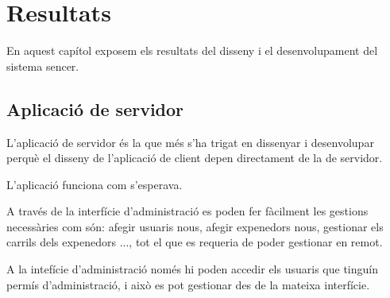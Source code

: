 \chapter{Resultats}\label{chapter:resultats}
\vspace{-0.5cm}
En aquest capítol exposem els resultats del disseny i el desenvolupament del sistema sencer.

\section{Aplicació de servidor}
L'aplicació de servidor és la que més s'ha trigat en dissenyar i desenvolupar perquè el disseny de l'aplicació de client depen directament de la de servidor.

L'aplicació funciona com s'esperava.

A través de la interfície d'administració es poden fer fàcilment les gestions necessàries com són: afegir usuaris nous, afegir expenedors nous, gestionar els carrils dels expenedors ..., tot el que es requeria de poder gestionar en remot.

A la intefície d'administració només hi poden accedir els usuaris que tinguín permís d'administració, i això es pot gestionar des de la mateixa interfície.

